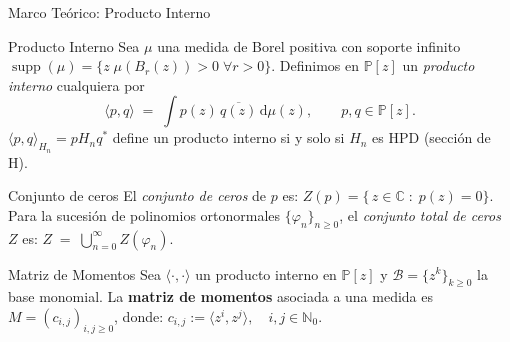 
\begin{frame}{Marco Teórico: Producto Interno}
	\footnotesize
	\begin{block}{\footnotesize Producto Interno }
		Sea $\mu$ una medida de Borel positiva con soporte infinito $\operatorname{supp}(\mu)=\{z\;\mu(B_r(z))>0\;\forall r>0\}$. Definimos en $\mathbb{P}[z]$ un \emph{producto interno} cualquiera por
		\[
			\langle p,q\rangle
			\;=\;
			\int p(z)\,\overline{q(z)}\,\mathrm d\mu(z),
			\qquad p,q\in\mathbb{P}[z].
		\]
		$\langle p, q \rangle_{H_n} = pH_nq^*$ define un producto interno si y solo si $H_n$ es HPD (sección de H).
	\end{block}
	\pause
	\begin{block}{\footnotesize Conjunto de ceros }
		El \emph{conjunto de ceros} de $p$ es:
		\(
		Z(p)=\bigl\{\,z\in\mathbb{C}\;:\;p(z)=0\bigr\}.
		\)
		Para la sucesión de polinomios ortonormales $\{\varphi_n\}_{n\ge0}$, el \emph{conjunto total de ceros} $Z$ es:
		\(
		Z \;=\; \bigcup_{n=0}^{\infty} Z(\varphi_n).
		\)
	\end{block}
	\begin{block}{\footnotesize Matriz de Momentos} %
		Sea $\langle\cdot,\cdot\rangle$ un producto interno en $\mathbb{P}[z]$ y $\mathcal{B}=\{z^k\}_{k\ge 0}$ la base monomial.
		La \textbf{matriz de momentos} asociada a una medida es $M=(c_{i,j})_{i,j\ge 0}$, donde:
		\( c_{i,j} := \langle z^i, z^j \rangle, \quad i,j\in\mathbb{N}_0. \)
	\end{block}
\end{frame}

